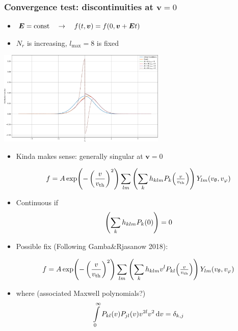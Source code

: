 \documentclass[mathserif, aspectratio=169]{beamer}
\newcommand{\ud}{\,\mathrm{d}}
\newcommand{\vect}[1]{\boldsymbol{#1}}
\newcommand{\of}[1]{\mleft( #1 \mright)}
\newcommand{\vth}{v_{\textrm{th}}}
\newcommand{\myint}{\int\limits}
\newcommand{\vr}{v}
\newcommand{\vtheta}{v_{\theta}}
\newcommand{\vphi}{v_{\varphi}}
\begin{document}
\begin{frame}
\frametitle{Convergence test: discontinuities at $\vect{v} = 0$}
\begin{itemize}
\item 
$\vect{E} = \text{const} \quad \rightarrow \quad f\of{t,\vect{v}} = f\of{0, \vect{v} + \vect{E}t}$
\item $N_r$ is increasing, $l_{\max} = 8$ is fixed
\end{itemize}
\begin{center}
\includegraphics[width=0.6\textwidth]{figures/advection_operator_test_nr}
\end{center}
\end{frame}

\begin{frame}
\begin{itemize}

\item Kinda makes sense: generally singular at $\vect{v} = 0$

\begin{align*}
f = A 
\exp\of{-\left(\frac{\vr}{\vth}\right)^2} 
\sum_{lm} \left(\sum_{k} h_{klm} P_k\of{\textstyle\frac{v}{\vth}}\right) Y_{lm}\of{\vtheta,\vphi}
\end{align*}

\item Continuous if 
\begin{align*}
\left(\sum_{k} h_{klm} P_k\of{0}\right) = 0
\end{align*}
\end{itemize}
%
\end{frame}

\begin{frame}
\begin{itemize}

\item Possible fix (Following Gamba\&Rjasanow 2018):

\begin{align*}
f = A 
\exp\of{-\left(\frac{\vr}{\vth}\right)^2} 
\sum_{lm} \left(\sum_{k} h_{klm} v^l P_{kl}\of{\textstyle\frac{v}{\vth}}\right) Y_{lm}\of{\vtheta,\vphi}
\end{align*}

\item where (associated Maxwell polynomials?)
\begin{align*}
\myint_0^\infty  P_{kl}\of{v} P_{jl}\of{v} v^{2l} v^2 \ud v = \delta_{k,j}
\end{align*}
\end{itemize}
%
\end{frame}


\end{document}
